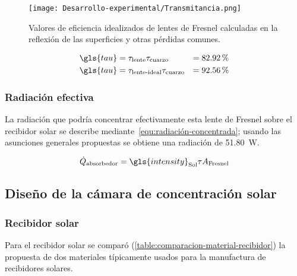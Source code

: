 					\begin{figure}[H]
						\centering
						\texttt{[image: Desarrollo-experimental/Transmitancia.png]}
						\caption{Valores de eficiencia idealizados de lentes de Fresnel calculadas en la reflexión de las superficies y otras pérdidas comunes.}
						\label{fig:Transmitancia}
					\end{figure}
					
					\begin{align}
						\gls{tau} &= \tau_{\text{lente}}\tau_{\text{cuarzo}} &= \percent{82.92}\label{equ:transmisión-cámara} \\
						\gls{tau} &= \tau_{\text{lente-ideal}}\tau_{\text{cuarzo}} &= \percent{92.56} \label{equ:transmisión-cámara-ideal}
					\end{align}
			
			\subsubsection{Radiación efectiva}
			
				La radiación que podría concentrar efectivamente esta lente de Fresnel sobre el recibidor solar se describe mediante~\eqref{equ:radiación-concentrada}; usando las asunciones generales propuestas se obtiene una radiación de \qty{51.80}{\watt}.
				
				\begin{equation}\label{equ:radiación-concentrada}
					\dot{Q}_{\text{absorbedor}} = \gls{intensity}_{\text{Sol}} \tau A_\text{Fresnel}
				\end{equation}
			
			
		
		\subsection{Diseño de la cámara de concentración solar}
			
			\subsubsection{Recibidor solar}
				
				Para el recibidor solar se comparó (\cref{table:comparacion-material-recibidor}) la propuesta de dos materiales típicamente usados para la manufactura de recibidores solares.
										
